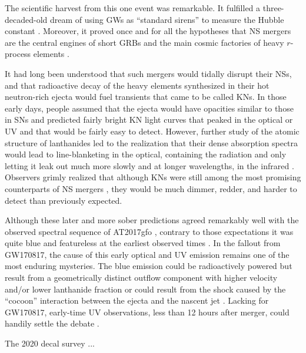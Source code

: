 \documentclass[twocolumn,times]{aastex631}
\begin{document}
The scientific harvest from this one event was remarkable. It fulfilled a three-decaded-old dream of using \acp{GW} as ``standard sirens'' to measure the Hubble constant \citep{1986Natur.323..310S,2017Natur.551...85A}. Moreover, it proved once and for all the hypotheses that \ac{NS} mergers are the central engines of short \acp{GRB} \citep{2013ApJ...776...18F} and the main cosmic factories of heavy $r$-process elements \citep{1999ApJ...525L.121F}. 

It had long been understood that such mergers would tidally disrupt their \acp{NS}, and that radioactive decay of the heavy elements synthesized in their hot neutron-rich ejecta would fuel transients \citep{1974ApJ...192L.145L,1989Natur.340..126E,1998ApJ...507L..59L} that came to be called \acp{KN}. In those early days, people assumed that the ejecta would have opacities similar to those in \acp{SN} and predicted fairly bright \ac{KN} light curves that peaked in the optical or \ac{UV} and that would be fairly easy to detect. However, further study of the atomic structure of lanthanides led to the realization that their dense absorption spectra would lead to line-blanketing in the optical, containing the radiation and only letting it leak out much more slowly and at longer wavelengths, in the infrared \citep{2013ApJ...774...25K}. Observers grimly realized that although \acp{KN} were still among the most promising counterparts of \ac{NS} mergers \citep{2012ApJ...746...48M}, they would be much dimmer, redder, and harder to detect than previously expected.

Although these later and more sober predictions agreed remarkably well with the observed spectral sequence of AT2017gfo \citep{2017Natur.551...67P,2017Natur.551...80K}, contrary to those expectations it was quite blue and featureless at the earliest observed times \citep{2017Sci...358.1574S}. In the fallout from GW170817, the cause of this early optical and \ac{UV} emission remains one of the most enduring mysteries. The blue emission could be radioactively powered but result from a geometrically distinct outflow component with higher velocity and/or lower lanthanide fraction \citep{2017ApJ...848L..18N} or could result from the shock caused by the ``cocoon'' interaction between the ejecta and the nascent jet \citep{2017Sci...358.1559K,2018MNRAS.479..588G}. Lacking for GW170817, early-time \ac{UV} observations, less than 12 hours after merger, could handily settle the debate \citep{2018ApJ...855L..23A}.


The 2020 decal survey \citet{2021pdaa.book.....N}...
\end{document}
